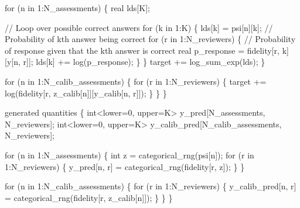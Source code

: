 \documentclass[
  letterpaper,
  DIV=11,
  numbers=noendperiod]{scrartcl}
\newenvironment{Shaded}{\begin{snugshade}}{\end{snugshade}}
\newcommand{\CommentTok}[1]{\textcolor[rgb]{0.37,0.37,0.37}{#1}}
\newcommand{\ControlFlowTok}[1]{\textcolor[rgb]{0.00,0.23,0.31}{#1}}
\newcommand{\DataTypeTok}[1]{\textcolor[rgb]{0.68,0.00,0.00}{#1}}
\newcommand{\DecValTok}[1]{\textcolor[rgb]{0.68,0.00,0.00}{#1}}
\newcommand{\KeywordTok}[1]{\textcolor[rgb]{0.00,0.23,0.31}{#1}}
\newcommand{\NormalTok}[1]{\textcolor[rgb]{0.00,0.23,0.31}{#1}}
\begin{document}
\begin{codelisting}
\begin{Shaded}
\begin{Highlighting}[]
  \ControlFlowTok{for}\NormalTok{ (n }\ControlFlowTok{in} \DecValTok{1}\NormalTok{:N\_assessments) \{}
    \DataTypeTok{real}\NormalTok{ lds[K];}
    
    \CommentTok{// Loop over possible correct answers}
    \ControlFlowTok{for}\NormalTok{ (k }\ControlFlowTok{in} \DecValTok{1}\NormalTok{:K) \{}
\NormalTok{      lds[k] = psi[n][k]; }\CommentTok{// Probability of kth answer being correct }
      \ControlFlowTok{for}\NormalTok{ (r }\ControlFlowTok{in} \DecValTok{1}\NormalTok{:N\_reviewers) \{}
        \CommentTok{// Probability of response given that the kth answer is correct}
        \DataTypeTok{real}\NormalTok{ p\_response = fidelity[r, k][y[n, r]];}
\NormalTok{        lds[k] += log(p\_response);}
\NormalTok{      \}}
\NormalTok{    \}}
    \KeywordTok{target +=}\NormalTok{ log\_sum\_exp(lds);}
\NormalTok{  \}}
  
  \ControlFlowTok{for}\NormalTok{ (n }\ControlFlowTok{in} \DecValTok{1}\NormalTok{:N\_calib\_assessments) \{}
    \ControlFlowTok{for}\NormalTok{ (r }\ControlFlowTok{in} \DecValTok{1}\NormalTok{:N\_reviewers) \{}
      \KeywordTok{target +=}\NormalTok{ log(fidelity[r, z\_calib[n]][y\_calib[n, r]]);}
\NormalTok{    \}}
\NormalTok{  \}}
\NormalTok{\}}

\KeywordTok{generated quantities}\NormalTok{ \{}
  \DataTypeTok{int}\NormalTok{\textless{}}\KeywordTok{lower}\NormalTok{=}\DecValTok{0}\NormalTok{, }\KeywordTok{upper}\NormalTok{=K\textgreater{} y\_pred[N\_assessments, N\_reviewers];}
  \DataTypeTok{int}\NormalTok{\textless{}}\KeywordTok{lower}\NormalTok{=}\DecValTok{0}\NormalTok{, }\KeywordTok{upper}\NormalTok{=K\textgreater{} y\_calib\_pred[N\_calib\_assessments, N\_reviewers];}
    
  \ControlFlowTok{for}\NormalTok{ (n }\ControlFlowTok{in} \DecValTok{1}\NormalTok{:N\_assessments) \{}
    \DataTypeTok{int}\NormalTok{ z = categorical\_rng(psi[n]);}
    \ControlFlowTok{for}\NormalTok{ (r }\ControlFlowTok{in} \DecValTok{1}\NormalTok{:N\_reviewers) \{}
\NormalTok{      y\_pred[n, r] = categorical\_rng(fidelity[r, z]);}
\NormalTok{    \}}
\NormalTok{  \}}
  
  \ControlFlowTok{for}\NormalTok{ (n }\ControlFlowTok{in} \DecValTok{1}\NormalTok{:N\_calib\_assessments) \{}
    \ControlFlowTok{for}\NormalTok{ (r }\ControlFlowTok{in} \DecValTok{1}\NormalTok{:N\_reviewers) \{}
\NormalTok{      y\_calib\_pred[n, r] = categorical\_rng(fidelity[r, z\_calib[n]]);}
\NormalTok{    \}}
\NormalTok{  \}}
\NormalTok{\}}
\end{Highlighting}
\end{Shaded}

\end{codelisting}
\end{document}
